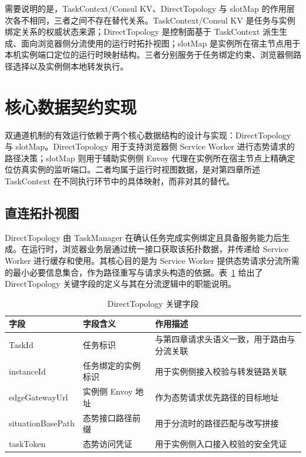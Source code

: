 \documentclass[lang=chs, degree=master, blindreview=true, winfonts=true, academic=false]{yanputhesis}
\begin{document}
需要说明的是，TaskContext/Consul KV、DirectTopology 与 slotMap 的作用层次各不相同，三者之间不存在替代关系。TaskContext/Consul KV 是任务与实例绑定关系的权威状态来源；DirectTopology 是控制面基于 TaskContext 派生生成、面向浏览器侧分流使用的运行时拓扑视图；slotMap 是实例所在宿主节点用于本机实例端口定位的运行时映射结构。三者分别服务于任务绑定约束、浏览器侧路径选择以及实例侧本地转发执行。

\section{核心数据契约实现}
双通道机制的有效运行依赖于两个核心数据结构的设计与实现：DirectTopology 与 slotMap。DirectTopology 用于支持浏览器侧 Service Worker 进行态势请求的路径决策；slotMap 则用于辅助实例侧 Envoy 代理在实例所在宿主节点上精确定位仿真实例的监听端口。二者均属于运行时视图数据，是对第四章所述 TaskContext 在不同执行环节中的具体映射，而非对其的替代。
\subsection{直连拓扑视图}

DirectTopology 由 TaskManager 在确认任务完成实例绑定且具备服务能力后生成。在运行时，浏览器业务层通过统一接口获取该拓扑数据，并传递给 Service Worker 进行缓存和使用。其核心目的是为 Service Worker 提供态势请求分流所需的最小必要信息集合，作为路径重写与请求头构造的依据。表~\ref{tab:5_1_direct_topology_definition} 给出了 DirectTopology 关键字段的定义与其在分流逻辑中的职能说明。
\begin{table}[!h]
    \centering
    \caption{DirectTopology 关键字段}
    \label{tab:5_1_direct_topology_definition}
    \begin{tabularx}{\textwidth}{>{\centering\arraybackslash}p{}
                                  >{\centering\arraybackslash}p{}
                                  >{\centering\arraybackslash}X}
        \toprule
        字段 & 字段含义 & 作用描述 \\ \midrule
        TaskId & 任务标识 & 与第四章请求头语义一致，用于路由与分流关联 \\
        instanceId & 任务绑定的实例标识 & 用于实例侧接入校验与转发链路关联 \\
        edgeGatewayUrl & 实例侧 Envoy 地址 & 作为态势请求优先路径的目标地址 \\
        situationBasePath & 态势接口路径前缀 & 用于分流时的路径匹配与改写拼接 \\
        taskToken & 态势访问凭证 & 用于实例侧入口接入校验的安全凭证 \\
        \bottomrule
    \end{tabularx}
\end{table}
\end{document}
